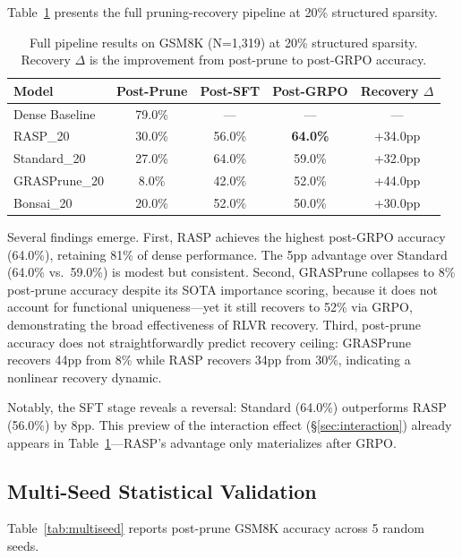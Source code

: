 \documentclass[11pt]{article}
\begin{document}
Table~\ref{tab:main} presents the full pruning-recovery pipeline at 20\% structured sparsity.

\begin{table}[t]
\centering
\caption{Full pipeline results on GSM8K (N=1,319) at 20\% structured sparsity. Recovery $\Delta$ is the improvement from post-prune to post-GRPO accuracy.}
\label{tab:main}
\begin{tabular}{lcccc}
\toprule
\textbf{Model} & \textbf{Post-Prune} & \textbf{Post-SFT} & \textbf{Post-GRPO} & \textbf{Recovery $\Delta$} \\
\midrule
Dense Baseline & 79.0\% & --- & --- & --- \\
\midrule
RASP\_20 & 30.0\% & 56.0\% & \textbf{64.0\%} & +34.0pp \\
Standard\_20 & 27.0\% & 64.0\% & 59.0\% & +32.0pp \\
GRASPrune\_20 & 8.0\% & 42.0\% & 52.0\% & +44.0pp \\
Bonsai\_20 & 20.0\% & 52.0\% & 50.0\% & +30.0pp \\
\bottomrule
\end{tabular}
\end{table}

Several findings emerge. First, RASP achieves the highest post-GRPO accuracy (64.0\%), retaining 81\% of dense performance. The 5pp advantage over Standard (64.0\% vs.\ 59.0\%) is modest but consistent. Second, GRASPrune collapses to 8\% post-prune accuracy despite its SOTA importance scoring, because it does not account for functional uniqueness---yet it still recovers to 52\% via GRPO, demonstrating the broad effectiveness of RLVR recovery. Third, post-prune accuracy does not straightforwardly predict recovery ceiling: GRASPrune recovers 44pp from 8\% while RASP recovers 34pp from 30\%, indicating a nonlinear recovery dynamic.

Notably, the SFT stage reveals a reversal: Standard (64.0\%) outperforms RASP (56.0\%) by 8pp. This preview of the interaction effect (\S\ref{sec:interaction}) already appears in Table~\ref{tab:main}---RASP's advantage only materializes after GRPO.

\subsection{Multi-Seed Statistical Validation}
\label{sec:multiseed}

Table~\ref{tab:multiseed} reports post-prune GSM8K accuracy across 5 random seeds.
\end{document}

